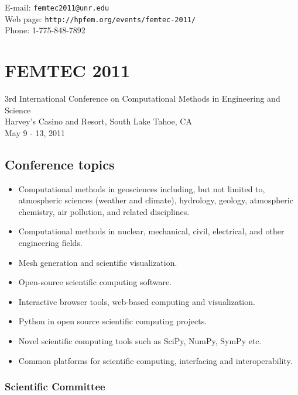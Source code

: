 \documentclass[article,A4,11pt]{llncs}
\begin{document}
\noindent
E-mail: {\tt femtec2011@unr.edu}\\
Web page: {\tt http://hpfem.org/events/femtec-2011/}\\
Phone: 1-775-848-7892

\chapter*{\huge FEMTEC 2011}
\vspace{-5mm}
\normalsize   
\begin{center}
3rd International Conference on Computational Methods in Engineering and Science\\
Harvey's Casino and Resort, South Lake Tahoe, CA\\ 
May 9 - 13, 2011\\
\end{center}
\vspace{-3mm}

\section*{Conference topics}

\begin{itemize}
\item Computational methods in geosciences including, but not limited to, 
      atmospheric sciences (weather and climate), hydrology, geology, 
      atmospheric chemistry, air pollution, and related disciplines. 
\item Computational methods in nuclear, mechanical, civil, electrical, and 
      other engineering fields. 
\item Mesh generation and scientific visualization. 
\item Open-source scientific computing software.
\item Interactive browser tools, web-based computing and visualization.
\item Python in open source scientific computing projects.
\item Novel scientific computing tools such as SciPy, NumPy, SymPy etc.
\item Common platforms for scientific computing, interfacing and interoperability.
\end{itemize}

\subsection*{Scientific Committee}
\end{document}
